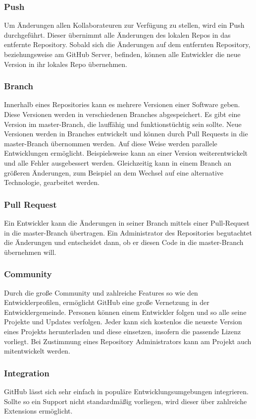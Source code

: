\documentclass[FIPLY_base.tex]{subfiles}
\begin{document}
\subsubsection{Push}
Um Änderungen allen Kollaborateuren zur Verfügung zu stellen, wird ein Push durchgeführt.
Dieser übernimmt alle Änderungen des lokalen Repos in das entfernte Repository.
Sobald sich die Änderungen auf dem entfernten Repository, beziehungsweise am GitHub Server, befinden, können alle Entwickler die neue Version in ihr lokales Repo übernehmen. 
 
\subsubsection{Branch}
Innerhalb eines Repositories kann es mehrere Versionen einer Software geben. Diese Versionen werden in verschiedenen Branches abgespeichert.
Es gibt eine Version im master-Branch, die lauffähig und funktionstüchtig sein sollte.
Neue Versionen werden in Branches entwickelt und können durch Pull Requests in die master-Branch übernommen werden. 
Auf diese Weise werden parallele Entwicklungen ermöglicht. Beispielsweise kann an einer Version weiterentwickelt und alle Fehler ausgebessert werden.
Gleichzeitig kann in einem Branch an größeren Änderungen, zum Beispiel an dem Wechsel auf eine alternative Technologie, gearbeitet werden.

\subsubsection{Pull Request}
Ein Entwickler kann die Änderungen in seiner Branch mittels einer Pull-Request in die master-Branch übertragen. 
Ein Administrator des Repositories begutachtet die Änderungen und entscheidet dann, ob er diesen Code in die master-Branch übernehmen will.

\subsubsection{Community}
Durch die große Community und zahlreiche Features so wie den Entwicklerprofilen, ermöglicht GitHub eine große Vernetzung in der Entwicklergemeinde.
Personen können einem Entwickler folgen und so alle seine Projekte und Updates verfolgen.
Jeder kann sich kostenlos die neueste Version eines Projekts herunterladen und diese einsetzen, insofern die passende Lizenz vorliegt. Bei Zustimmung eines Repository Administrators kann am Projekt auch mitentwickelt werden.

\subsubsection{Integration}
GitHub lässt sich sehr einfach in populäre Entwicklungsumgebungen integrieren. 
Sollte so ein Support nicht standardmäßig vorliegen, wird dieser über zahlreiche Extensions ermöglicht.
\end{document}
